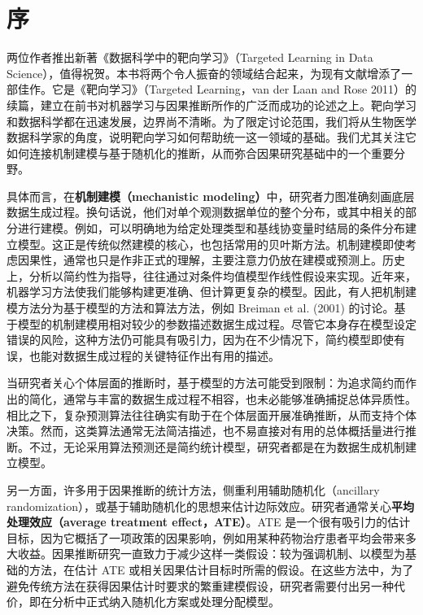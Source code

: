 
\chapter*{序}

两位作者推出新著《数据科学中的靶向学习》（Targeted Learning in Data Science），值得祝贺。本书将两个令人振奋的领域结合起来，为现有文献增添了一部佳作。它是《靶向学习》（Targeted Learning，van der Laan and Rose 2011）的续篇，建立在前书对机器学习与因果推断所作的广泛而成功的论述之上。靶向学习和数据科学都在迅速发展，边界尚不清晰。为了限定讨论范围，我们将从生物医学数据科学家的角度，说明靶向学习如何帮助统一这一领域的基础。我们尤其关注它如何连接机制建模与基于随机化的推断，从而弥合因果研究基础中的一个重要分野。

具体而言，在\textbf{机制建模（mechanistic modeling）}中，研究者力图准确刻画底层数据生成过程。换句话说，他们对单个观测数据单位的整个分布，或其中相关的部分进行建模。例如，可以明确地为给定处理类型和基线协变量时结局的条件分布建立模型。这正是传统似然建模的核心，也包括常用的贝叶斯方法。机制建模即使考虑因果性，通常也只是作非正式的理解，主要注意力仍放在建模或预测上。历史上，分析以简约性为指导，往往通过对条件均值模型作线性假设来实现。近年来，机器学习方法使我们能够构建更准确、但计算更复杂的模型。因此，有人把机制建模方法分为基于模型的方法和算法方法，例如 Breiman et al. (2001) 的讨论。基于模型的机制建模用相对较少的参数描述数据生成过程。尽管它本身存在模型设定错误的风险，这种方法仍可能具有吸引力，因为在不少情况下，简约模型即使有误，也能对数据生成过程的关键特征作出有用的描述。

当研究者关心个体层面的推断时，基于模型的方法可能受到限制：为追求简约而作出的简化，通常与丰富的数据生成过程不相容，也未必能够准确捕捉总体异质性。相比之下，复杂预测算法往往确实有助于在个体层面开展准确推断，从而支持个体决策。然而，这类算法通常无法简洁描述，也不易直接对有用的总体概括量进行推断。不过，无论采用算法预测还是简约统计模型，研究者都是在为数据生成机制建立模型。

另一方面，许多用于因果推断的统计方法，侧重利用辅助随机化（ancillary randomization），或基于辅助随机化的思想来估计边际效应。研究者通常关心\textbf{平均处理效应（average treatment effect，ATE）}。ATE 是一个很有吸引力的估计目标，因为它概括了一项政策的因果影响，例如用某种药物治疗患者平均会带来多大收益。因果推断研究一直致力于减少这样一类假设：较为强调机制、以模型为基础的方法，在估计 ATE 或相关因果估计目标时所需的假设。在这些方法中，为了避免传统方法在获得因果估计时要求的繁重建模假设，研究者需要付出另一种代价，即在分析中正式纳入随机化方案或处理分配模型。

